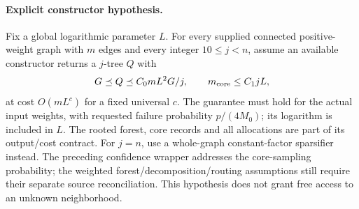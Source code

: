 \paragraph{Explicit constructor hypothesis.}
Fix a global logarithmic parameter $L$. For every supplied connected
positive-weight graph with $m$ edges and every integer $10\leq j<n$,
assume an available constructor returns a $j$-tree $Q$ with
\[
 G\preceq Q\preceq C_0mL^2G/j,
 \qquad m_{\rm core}\leq C_1jL,
\]
at cost $O(mL^c)$ for a fixed universal $c$. The guarantee must hold
for the actual input weights, with requested failure probability
$p/(4M_0)$; its logarithm is included in $L$. The rooted forest,
core records and all allocations are part of its output/cost contract.
For $j=n$, use a whole-graph constant-factor sparsifier instead.
The preceding confidence wrapper addresses the core-sampling probability;
the weighted forest/decomposition/routing assumptions still require their
separate source reconciliation. This hypothesis does not grant free
access to an unknown neighborhood.

